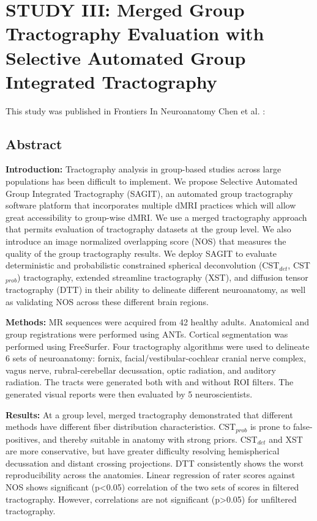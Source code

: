 \graphicspath{{images/sagit/drafts/}}

\chapter{STUDY III: Merged Group Tractography Evaluation with Selective Automated Group Integrated Tractography}
\label{section:study3}

This study was published in Frontiers In Neuroanatomy  Chen et al. :


\section{Abstract }
\textbf{Introduction:} Tractography analysis in group-based studies across large populations has been difficult to implement. We propose Selective Automated Group Integrated Tractography (SAGIT), an automated group tractography software platform that incorporates multiple dMRI practices which will allow great accessibility to group-wise dMRI. We use a merged tractography approach that permits evaluation of tractography datasets at the group level.  We also introduce an image normalized overlapping score (NOS) that measures the quality of the group tractography results. We deploy SAGIT to evaluate deterministic and probabilistic constrained spherical deconvolution (CST$_{det}$, CST$_{prob}$) tractography, extended streamline tractography (XST), and diffusion tensor tractography (DTT) in their ability to delineate different neuroanatomy, as well as validating NOS across these different brain regions. 

\textbf{Methods:} MR sequences were acquired from 42 healthy adults. Anatomical and group registrations were performed using ANTs. Cortical segmentation was performed using FreeSurfer. Four tractography algorithms were used to delineate 6 sets of neuroanatomy: fornix, facial/vestibular-cochlear cranial nerve complex, vagus nerve, rubral-cerebellar decussation, optic radiation, and auditory radiation. The tracts were generated both with and without ROI filters. The generated visual reports were then evaluated by 5 neuroscientists. 

\textbf{Results:} At a group level, merged tractography demonstrated that different methods have different fiber distribution characteristics. CST$_{prob}$ is prone to false-positives, and thereby suitable in anatomy with strong priors. CST$_{det}$ and XST are more conservative, but have greater difficulty resolving hemispherical decussation and distant crossing projections. DTT consistently shows the worst reproducibility across the anatomies. Linear regression of rater scores against NOS shows significant (p\textless0.05) correlation of the two sets of scores in filtered tractography. However, correlations are not significant (p\textgreater0.05) for unfiltered tractography.

